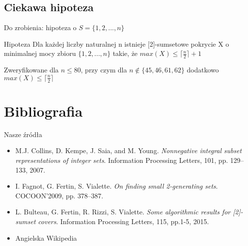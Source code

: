 \documentclass{beamer}
\begin{document}
	\subsection{Ciekawa hipoteza}
		\begin{frame}{Do zrobienia: hipoteza o $ S = \lbrace 1,2,...,n \rbrace $}
			\begin{alertblock}{Hipoteza}
				Dla każdej liczby naturalnej n istnieje [2]-sumsetowe pokrycie X o minimalnej mocy zbioru $ \lbrace 1,2,...,n \rbrace $ takie, że $ max(X) \leq \lceil \frac{n}{2} \rceil + 1 $
			\end{alertblock}
			
			\pause
			\vspace{\baselineskip}
			Zweryfikowane dla $ n \leq 80 $, przy czym dla $ n \notin \lbrace 45,46,61,62 \rbrace $ dodatkowo $ max(X) \leq \lceil \frac{n}{2} \rceil $
		\end{frame}

\section{Bibliografia}
	\begin{frame}{Nasze źródła}
		\begin{itemize}
			\item M.J. Collins, D. Kempe, J. Saia, and M. Young. \textit{Nonnegative integral
subset representations of integer sets}. Information Processing Letters, 101, pp. 129–133, 2007.
			\item I. Fagnot, G. Fertin, S. Vialette. \textit{On finding small 2-generating sets}. COCOON'2009, pp. 378–387.
			\item L. Bulteau, G. Fertin, R. Rizzi, S. Vialette. \textit{Some algorithmic results
for [2]-sumset covers}. Information Processing Letters, 115, pp.1-5, 2015.
			\item Angielska Wikipedia
		\end{itemize}
	\end{frame}
	
\end{document}
